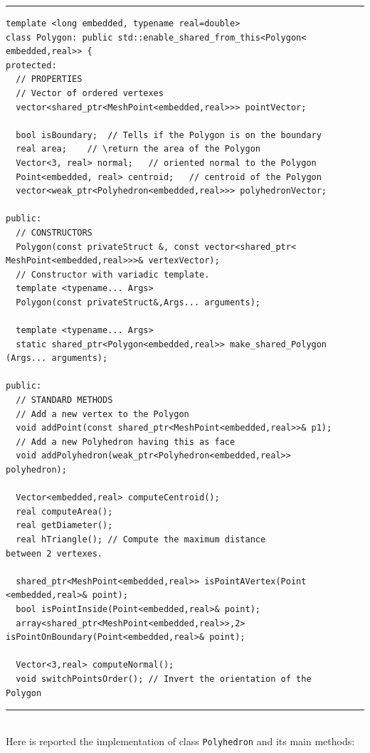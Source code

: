 \noindent\rule{12.7cm}{1pt}
\begin{verbatim}
template <long embedded, typename real=double>
class Polygon: public std::enable_shared_from_this<Polygon<
embedded,real>> {
protected:
  // PROPERTIES
  // Vector of ordered vertexes
  vector<shared_ptr<MeshPoint<embedded,real>>> pointVector;
	
  bool isBoundary;	// Tells if the Polygon is on the boundary
  real area;	// \return the area of the Polygon
  Vector<3, real> normal;	// oriented normal to the Polygon
  Point<embedded, real> centroid;	// centroid of the Polygon
  vector<weak_ptr<Polyhedron<embedded,real>>> polyhedronVector;

public:
  // CONSTRUCTORS
  Polygon(const privateStruct &, const vector<shared_ptr<
MeshPoint<embedded,real>>>& vertexVector);
  // Constructor with variadic template.
  template <typename... Args>
  Polygon(const privateStruct&,Args... arguments);

  template <typename... Args>
  static shared_ptr<Polygon<embedded,real>> make_shared_Polygon
(Args... arguments);

public:
  // STANDARD METHODS
  // Add a new vertex to the Polygon
  void addPoint(const shared_ptr<MeshPoint<embedded,real>>& p1); 
  // Add a new Polyhedron having this as face
  void addPolyhedron(weak_ptr<Polyhedron<embedded,real>> 
polyhedron);	
			
  Vector<embedded,real> computeCentroid();
  real computeArea();
  real getDiameter();
  real hTriangle(); // Compute the maximum distance 
between 2 vertexes.

  shared_ptr<MeshPoint<embedded,real>> isPointAVertex(Point
<embedded,real>& point);	
  bool isPointInside(Point<embedded,real>& point);
  array<shared_ptr<MeshPoint<embedded,real>>,2> 
isPointOnBoundary(Point<embedded,real>& point);

  Vector<3,real> computeNormal();
  void switchPointsOrder(); // Invert the orientation of the 
Polygon
\end{verbatim}

\noindent\rule{12.7cm}{1pt}\\

Here is reported the implementation of class \verb|Polyhedron| and its main methods:

